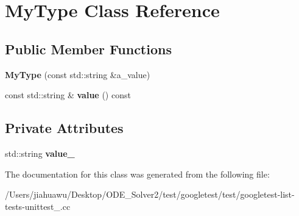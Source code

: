 \hypertarget{class_my_type}{}\section{My\+Type Class Reference}
\label{class_my_type}
\subsection*{Public Member Functions}
\begin{DoxyCompactItemize}
\item 
\mbox{\label{class_my_type_a74d6f29a06e298321a6e5f0b91b020e7}} 
{\bfseries My\+Type} (const std\+::string \&a\+\_\+value)
\item 
\mbox{\label{class_my_type_a04eaace57f0ecd8ee8898defbdee31b4}} 
const std\+::string \& {\bfseries value} () const
\end{DoxyCompactItemize}
\subsection*{Private Attributes}
\begin{DoxyCompactItemize}
\item 
\mbox{\label{class_my_type_ae294bc35031fef7015a1b135deeedd22}} 
std\+::string {\bfseries value\+\_\+}
\end{DoxyCompactItemize}


The documentation for this class was generated from the following file\+:\begin{DoxyCompactItemize}
\item 
/\+Users/jiahuawu/\+Desktop/\+O\+D\+E\+\_\+\+Solver2/test/googletest/test/googletest-\/list-\/tests-\/unittest\+\_\+.\+cc\end{DoxyCompactItemize}
